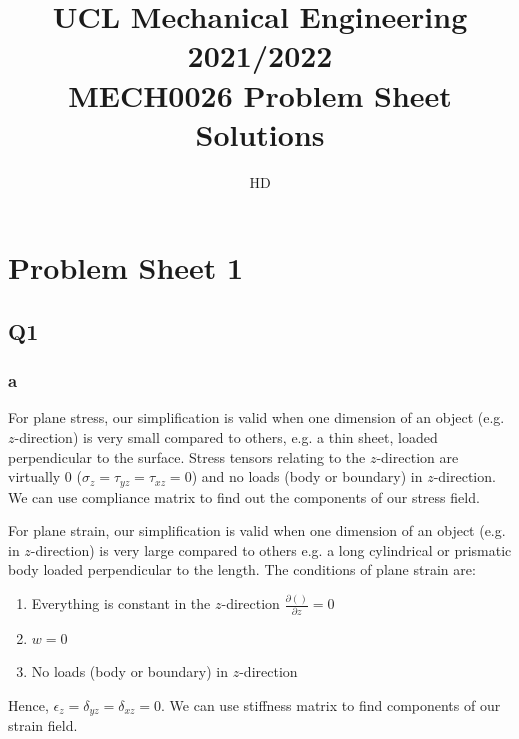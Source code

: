 \documentclass[11pt]{article}
\numberwithin{equation}{section}
\begin{document}
\title{\textbf{UCL Mechanical Engineering 2021/2022}\\MECH0026 Problem Sheet Solutions}
\author{HD}
\maketitle
\section{Problem Sheet 1}
\subsection{Q1}
\subsubsection{a}
For plane stress, our simplification is valid when one dimension of an object (e.g. $z$-direction) is very small compared to others, e.g. a thin sheet, loaded perpendicular to the surface. Stress tensors relating to the $z$-direction are virtually 0 ($\sigma_z = \tau_{yz} = \tau_{xz} =0$) and no loads (body or boundary) in $z$-direction. We can use compliance matrix to find out the components of our stress field.

For plane strain, our simplification is valid when one dimension of an object (e.g. in $z$-direction) is very large compared to others e.g. a long cylindrical or prismatic body loaded perpendicular to the length. The conditions of plane strain are:
\begin{enumerate}
    \item Everything is constant in the $z$-direction $\frac{\partial ()}{\partial z} = 0$
    \item $w = 0$
    \item No loads (body or boundary) in $z$-direction
\end{enumerate}
Hence, $\epsilon_z = \delta_{yz} = \delta_{xz} =0$. We can use stiffness matrix to find components of our strain field.
\end{document}
